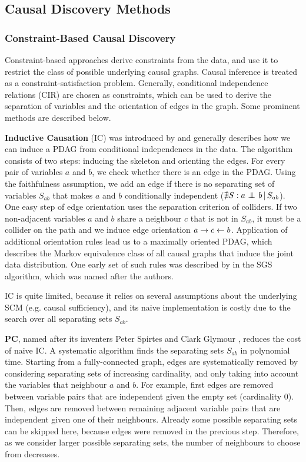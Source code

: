\subsection{Causal Discovery Methods}



\subsubsection{Constraint-Based Causal Discovery}
Constraint-based approaches derive constraints from the data, and use it to restrict the class of possible underlying causal graphs. Causal inference is treated as a constraint-satisfaction problem. Generally, conditional independence relations (CIR) are chosen as constraints, which can be used to derive the separation of variables and the orientation of edges in the graph. Some prominent methods are described below.

\textbf{Inductive Causation} (IC) was introduced by \citet{verma1991equivalence} and generally describes how we can induce a PDAG from conditional independences in the data. The algorithm consists of two steps: inducing the skeleton and orienting the edges. For every pair of variables $a$ and $b$, we check whether there is an edge in the PDAG. Using the faithfulness assumption, we add an edge if there is no separating set of variables $S_{ab}$ that makes $a$ and $b$ conditionally independent ($\nexists S : {a} \operatorname*{{\,\perp\mkern-12mu\perp\,}}_{} {b} \,|\, {S_{ab}}$). One easy step of edge orientation uses the separation criterion of colliders. If two non-adjacent variables $a$ and $b$ share a neighbour $c$ that is not in $S_{ab}$, it must be a collider on the path and we induce edge orientation $a\to c \leftarrow b$. Application of additional orientation rules lead us to a maximally oriented PDAG, which describes the Markov equivalence class of all causal graphs that induce the joint data distribution. One early set of such rules was described by \citet{spirtes2000causation} in the SGS algorithm, which was named after the authors.
            
IC is quite limited, because it relies on several assumptions about the underlying SCM (e.g. causal sufficiency), and its naive implementation is costly due to the search over all separating sets $S_{ab}$.

\textbf{PC}, named after its inventers Peter Spirtes and Clark Glymour \citep{spirtes1991algorithm}, reduces the cost of naive IC. A systematic algorithm finds the separating sets $S_{ab}$ in polynomial time. Starting from a fully-connected graph, edges are systematically removed by considering separating sets of increasing cardinality, and only taking into account the variables that neighbour $a$ and $b$. For example, first edges are removed between variable pairs that are independent given the empty set (cardinality 0). Then, edges are removed between remaining adjacent variable pairs that are independent given one of their neighbours. Already some possible separating sets can be skipped here, because edges were removed in the previous step. Therefore, as we consider larger possible separating sets, the number of neighbours to choose from decreases.
            
